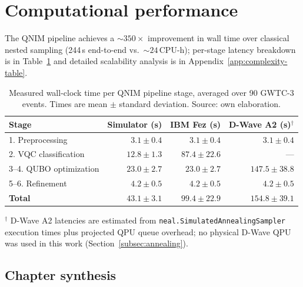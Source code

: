 \documentclass[11pt,a4paper, english]{book}
\theoremstyle{plain}
\theoremstyle{definition}
\numberwithin{equation}{chapter}
\numberwithin{figure}{chapter}
\numberwithin{table}{chapter}
\begin{document}
\section{Computational performance}
\label{sec:computational-performance}

The QNIM pipeline achieves a $\sim\!350\times$ improvement in wall time over classical nested sampling (244\,s end-to-end vs.\ $\sim 24$\,CPU-h); per-stage latency breakdown is in Table~\ref{tab:latency} and detailed scalability analysis is in Appendix~\ref{app:complexity-table}.

\begin{table}[ht]
\centering
\begin{tabular}{@{}lrrr@{}}
\toprule
\textbf{Stage} & \textbf{Simulator (s)} &
\textbf{IBM Fez (s)} & \textbf{D-Wave A2 (s)}$^\dagger$ \\
\midrule
1. Preprocessing & $3.1 \pm 0.4$ & $3.1 \pm 0.4$ & $3.1 \pm 0.4$ \\
2. VQC classification & $12.8 \pm 1.3$ & $87.4 \pm 22.6$ & --- \\
3--4. QUBO optimization & $23.0 \pm 2.7$ & $23.0 \pm 2.7$ & $147.5 \pm 38.8$ \\
5--6. Refinement & $4.2 \pm 0.5$ & $4.2 \pm 0.5$ & $4.2 \pm 0.5$ \\
\midrule
\textbf{Total}          & $43.1 \pm 3.1$ & $99.4 \pm 22.9$ & $154.8 \pm 39.1$ \\
\bottomrule
\end{tabular}
\caption[Wall-clock time per QNIM pipeline stage]{Measured wall-clock time per QNIM pipeline stage, averaged over
         90 GWTC-3 events. Times are mean $\pm$ standard deviation. Source: own elaboration.}
\label{tab:latency}
\vspace{2pt}


$^\dagger$ D-Wave A2 latencies are estimated from
\texttt{neal.SimulatedAnnealingSampler} execution 
times plus projected QPU queue overhead; no physical 
D-Wave QPU was used in this work 
(Section~\ref{subsec:annealing}).
\end{table}

\subsection{Chapter synthesis}
\label{subsec:ch7-synthesis}
\end{document}
